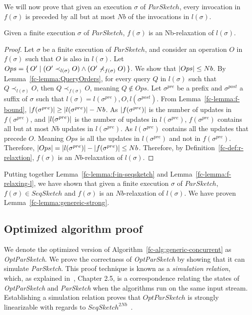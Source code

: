 We will now prove that given an execution $\sigma$ of $ParSketch$, every invocation in $f(\sigma)$
is preceded by all but at most $Nb$ of the invocations in $l(\sigma)$.
\begin{lemma}
    Given a finite execution $\sigma$ of $ParSketch$, $f(\sigma)$ is an Nb-relaxation of $l(\sigma)$.
    \label{fc-lemma:f-relaxing-l}
\end{lemma}
\begin{proof}
    Let $\sigma$ be a finite execution of $ParSketch$, and consider an operation $O$ in $f(\sigma)$
    such that $O$ is also in $l(\sigma)$. Let $Ops = \{\,O' \mid (O' \prec_{l(\sigma)} O) \wedge (O' \nprec_{f(\sigma)} O)\,\}$.
    We show that $\lvert Ops\rvert \leq Nb$.
    By Lemma~\ref{fc-lemma:QueryOrders}, for every query $Q$ in $l(\sigma)$ such that $Q \prec_{l(\sigma)} O$,
    then $Q \prec_{f(\sigma)} O$, meaning $Q \notin Ops$.
    Let $\sigma^{pre}$ be a prefix and $\sigma^{post}$ a suffix of $\sigma$ such that
    $l(\sigma)=l(\sigma^{pre}),O,l(\sigma^{post})$. From Lemma~\ref{fc-lemma:f-bound}, $\lvert f(\sigma^{pre})\rvert \geq \lvert l(\sigma^{pre})\rvert - Nb$.
    As $\lvert f(\sigma^{pre})\rvert$ is the number of updates in $f(\sigma^{pre})$, and $\lvert l(\sigma^{pre})\rvert$ is the number of updates
    in $l(\sigma^{pre})$, $f(\sigma^{pre})$ contains all but at most $Nb$ updates in $l(\sigma^{pre})$. As $l(\sigma^{pre})$
    contains all the updates that precede $O$. Meaning $Ops$ is all the updates in $l(\sigma^{pre})$ and not in
    $f(\sigma^{pre})$. Therefore, $\lvert Ops\rvert = \lvert l(\sigma^{pre})\rvert - \lvert f(\sigma^{pre})\rvert \leq Nb$.
    Therefore, by Definition~\ref{fc-def:r-relaxtion}, $f(\sigma)$ is an $Nb$-relaxation of $l(\sigma)$.
\end{proof}

Putting together Lemma~\ref{fc-lemma:f-in-seqsketch} and Lemma~\ref{fc-lemma:f-relaxing-l}, we have shown that
given a finite execution $\sigma$ of $ParSketch$, $f(\sigma) \in SeqSketch$ and $f(\sigma)$ is an $Nb$-relaxation
of $l(\sigma)$. We have proven Lemma~\ref{fc-lemma:genereic-strong}.

\subsection{Optimized algorithm proof}
\label{fc-subsec:Optimised-algorithm-proof}
We denote the optimized version of Algorithm~\ref{fc-alg:generic-concurrent} as \emph{OptParSketch}. 
We prove the correctness of \emph{OptParSketch} by showing that it can simulate  \emph{ParSketch}. 
This proof technique is known as   a \emph{simulation relation}, which, as explained in~\cite{lynch1996distributed}, Chapter 2.5, 
is a correspondence relating the states of \emph{OptParSketch} and \emph{ParSketch} when the algorithms run on the same input stream. 
Establishing a simulation relation proves that $OptParSketch$ is strongly linearizable with regards to 
$SeqSketch^{2Nb}$~\cite{10.1016/j.tcs.2010.09.021,attiya2019putting}.

